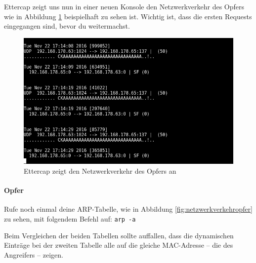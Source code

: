 Ettercap zeigt uns nun in einer neuen Konsole den Netzwerkverkehr des Opfers wie in Abbildung \ref{fig:ettercaparp} beispielhaft zu sehen ist. Wichtig ist, dass die ersten Requests eingegangen sind, bevor du weitermachst.

\begin{figure}
	\centering
	\includegraphics[width=\textwidth]{images/ARP_Spoofing/ettercaparp}
	\caption{Ettercap zeigt den Netzwerkverkehr des Opfers an}
	\label{fig:ettercaparp}
\end{figure}

\paragraph{Opfer} Rufe noch einmal deine ARP-Tabelle, wie in Abbildung \ref{fig:netzwerkverkehropfer} zu sehen, mit folgendem Befehl auf: \colorbox{altgray}{\lstinline|arp -a|}

Beim Vergleichen der beiden Tabellen sollte auffallen, dass die dynamischen Einträge bei der zweiten Tabelle alle auf die gleiche MAC-Adresse -- die des Angreifers -- zeigen.

